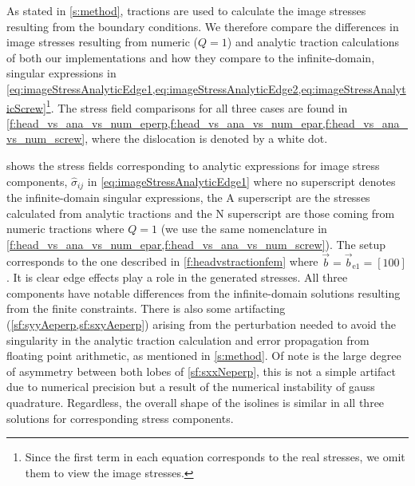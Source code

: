 \documentclass[11pt]{iopart}
\begin{document}
As stated in \cref{s:method}, tractions are used to calculate the image stresses resulting from the boundary conditions. We therefore compare the differences in image stresses resulting from numeric ($Q = 1$) and analytic traction calculations of both our implementations and how they compare to the infinite-domain, singular expressions in \cref{eq:imageStressAnalyticEdge1,eq:imageStressAnalyticEdge2,eq:imageStressAnalyticScrew}\footnote{Since the first term in each equation corresponds to the real stresses, we omit them to view the image stresses.}. The stress field comparisons for all three cases are found in \cref{f:head_vs_ana_vs_num_eperp,f:head_vs_ana_vs_num_epar,f:head_vs_ana_vs_num_screw}, where the dislocation is denoted by a white dot.

 shows the stress fields corresponding to analytic expressions for image stress components, $\hat{\sigma}_{ij}$ in \cref{eq:imageStressAnalyticEdge1} where no superscript denotes the infinite-domain singular expressions, the $\textrm{A}$ superscript are the stresses calculated from analytic tractions and the $\textrm{N}$ superscript are those coming from numeric tractions where $Q = 1$ (we use the same nomenclature in \cref{f:head_vs_ana_vs_num_epar,f:head_vs_ana_vs_num_screw}). The setup corresponds to the one described in \cref{f:headvstractionfem} where $\vec{b} = \vec{b}_{\textrm{e1}} = [1 0 0]$. It is clear edge effects play a role in the generated stresses. All three components have notable differences from the infinite-domain solutions resulting from the finite constraints. There is also some artifacting (\cref{sf:syyAeperp,sf:sxyAeperp}) arising from the perturbation needed to avoid the singularity in the analytic traction calculation and error propagation from floating point arithmetic, as mentioned in \cref{s:method}. Of note is the large degree of asymmetry between both lobes of \cref{sf:sxxNeperp}, this is not a simple artifact due to numerical precision but a result of the numerical instability of gauss quadrature. Regardless, the overall shape of the isolines is similar in all three solutions for corresponding stress components.
\end{document}
